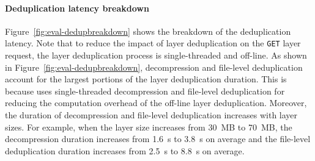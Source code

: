 \paragraph{Deduplication latency breakdown}
Figure~\ref{fig:eval-dedupbreakdown} shows the breakdown of the deduplication latency.
Note that to reduce the impact of layer deduplication on the \texttt{GET} layer request, the layer deduplication process is single-threaded and off-line.
As shown in Figure~\ref{fig:eval-dedupbreakdown}, decompression and file-level deduplication account for the largest portions of the layer deduplication duration.
This is because \sysname uses single-threaded decompression and file-level deduplication for reducing the computation overhead of the off-line layer deduplication.
Moreover, the duration of decompression and file-level deduplication increases with layer sizes.
For example, when the layer size increases from 30~MB to 70~MB, the decompression duration increases from 1.6~s to 3.8~s on average and the file-level deduplication duration increases from 2.5~s to 8.8~s on average.


